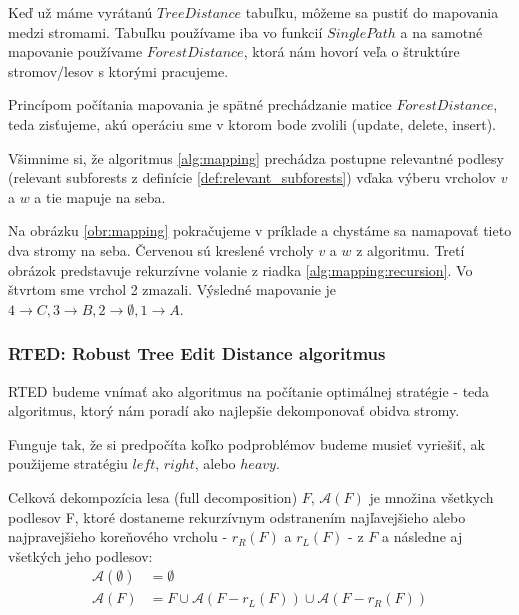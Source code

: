 Keď už máme vyrátanú $TreeDistance$ tabuľku, môžeme sa pustiť do mapovania medzi
stromami. Tabuľku používame iba vo funkcií $SinglePath$ a na samotné mapovanie
používame $ForestDistance$, ktorá nám hovorí veľa o štruktúre stromov/lesov
s ktorými pracujeme.



Princípom počítania mapovania je spätné prechádzanie matice $ForestDistance$, teda
zisťujeme, akú operáciu sme v ktorom bode zvolili (update, delete, insert).

Všimnime si, že algoritmus \ref{alg:mapping} prechádza postupne
relevantné podlesy (relevant subforests z definície \ref{def:relevant_subforests})
vďaka výberu vrcholov $v$ a $w$ a tie mapuje na seba.

Na obrázku \ref{obr:mapping} pokračujeme v príklade a chystáme sa namapovať tieto
dva stromy na seba. Červenou sú kreslené vrcholy $v$ a $w$ z algoritmu.
Tretí obrázok predstavuje rekurzívne volanie z riadka \ref{alg:mapping:recursion}.
Vo štvrtom sme vrchol 2 zmazali.
Výsledné mapovanie je $4 \to C, 3 \to B, 2 \to \emptyset, 1 \to A$.





\subsubsection{RTED: Robust Tree Edit Distance algoritmus}

RTED budeme vnímať ako algoritmus na počítanie optimálnej stratégie - teda algoritmus,
ktorý nám poradí ako najlepšie dekomponovať obidva stromy.

Funguje tak, že si predpočíta koľko podproblémov budeme musieť vyriešiť, ak použijeme stratégiu
$left$, $right$, alebo $heavy$.

\begin{definice}
	Celková dekompozícia lesa (full decomposition) $F$, $\mathcal{A}(F)$ je množina
	všetkych podlesov F, ktoré dostaneme rekurzívnym odstranením najľavejšieho
	alebo najpravejšieho koreňového vrcholu - $r_{R}(F)$ a $r_{L}(F)$ - z $F$
	a následne aj všetkých jeho podlesov:
	\begin{align*}
		\mathcal{A}(\emptyset) &= \emptyset
		\\
		\mathcal{A}(F) &= {F} \cup \mathcal{A}(F - r_{L}(F)) \cup \mathcal{A}(F - r_{R}(F))
	\end{align*}
\end{definice}

